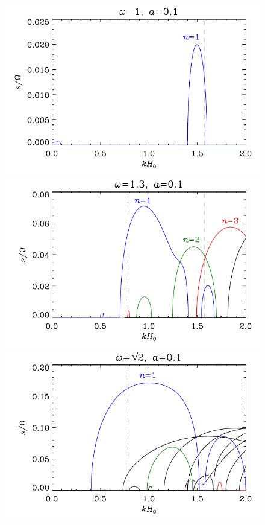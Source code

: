\documentclass[fleqn,usenatbib]{mnras}
\begin{document}
\begin{figure}
\centering
\includegraphics[scale=0.45]{Figures/results_floquet_omega1p0_a0p1.pdf}
\includegraphics[scale=0.45]{Figures/results_floquet_omega1p3_a0p1.pdf}
\includegraphics[scale=0.45]{Figures/results_floquet_omegasqrt2_a0p1.pdf}

\end{figure}
\end{document}
